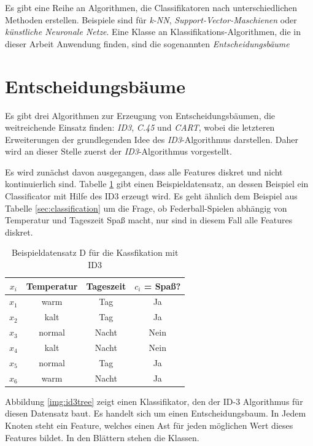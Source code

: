 Es gibt eine Reihe an Algorithmen, die Classifikatoren nach unterschiedlichen Methoden erstellen. Beispiele sind für \emph{k-NN}, \emph{Support-Vector-Maschienen} oder \emph{künstliche Neuronale Netze}. Eine Klasse an Klassifikations-Algorithmen, die in dieser Arbeit Anwendung finden, sind die sogenannten \emph{Entscheidungsbäume}

\section{Entscheidungsbäume}

Es gibt drei Algorithmen zur Erzeugung von Entscheidungsbäumen, die weitreichende Einsatz finden: \emph{ID3}, \emph{C.45} und \emph{CART}, wobei die letzteren Erweiterungen der grundlegenden Idee des \emph{ID3}-Algorithmus darstellen. Daher wird an dieser Stelle zuerst der \emph{ID3}-Algorithmus vorgestellt. 

Es wird zunächst davon ausgegangen, dass alle Features diskret und nicht kontinuierlich sind. Tabelle \ref{tab:id3_example} gibt einen Beispieldatensatz, an dessen Beispiel ein Classificator mit Hilfe des ID3 erzeugt wird. Es geht ähnlich dem Beispiel aus Tabelle \ref{sec:classification} um die Frage, ob Federball-Spielen abhängig von Temperatur und Tageszeit Spaß macht, nur sind in diesem Fall alle Features diskret. 

\begin{table}[h]
	\centering
	\caption{Beispieldatensatz D für die Kassfikation mit ID3}
	\label{tab:id3_example}
	\begin{tabular}{cccc}
		\toprule
		$x_i$    &Temperatur   & Tageszeit & $c_i$ = Spaß? \\\midrule
		$x_1$  & warm                & Tag          & Ja           \\
		$x_2$  & kalt                & Tag          & Ja           \\
		$x_3$  & normal                & Nacht          & Nein         \\
		$x_4$  & kalt                & Nacht          & Nein           \\
		$x_5$  & normal                & Tag         & Ja       \\
		$x_6$  & warm                & Nacht          & Ja       \\ \bottomrule  
	\end{tabular}
\end{table}

Abbildung \ref{img:id3tree} zeigt einen Klassifikator, den der ID-3 Algorithmus für diesen Datensatz baut. Es handelt sich um einen Entscheidungsbaum. In Jedem Knoten steht ein Feature, welches einen Ast für jeden möglichen Wert dieses Features bildet. In den Blättern stehen die Klassen.\cite[S. 134]{machine_marsland}


